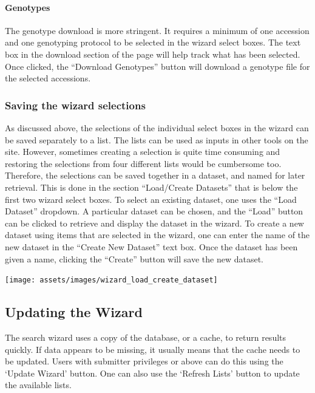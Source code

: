 \documentclass[
  12pt,
]{book}
\begin{document}
\hypertarget{genotypes}{%
\paragraph*{Genotypes}\label{genotypes}}

The genotype download is more stringent. It requires a minimum of one accession and one genotyping protocol to be selected in the wizard select boxes. The text box in the download section of the page will help track what has been selected. Once clicked, the ``Download Genotypes'' button will download a genotype file for the selected accessions.

\hypertarget{saving-the-wizard-selections}{%
\subsubsection*{Saving the wizard selections}\label{saving-the-wizard-selections}}


As discussed above, the selections of the individual select boxes in the wizard can be saved separately to a list. The lists can be used as inputs in other tools on the site. However, sometimes creating a selection is quite time consuming and restoring the selections from four different lists would be cumbersome too. Therefore, the selections can be saved together in a dataset, and named for later retrieval. This is done in the section ``Load/Create Datasets'' that is below the first two wizard select boxes. To select an existing dataset, one uses the ``Load Dataset'' dropdown. A particular dataset can be chosen, and the ``Load'' button can be clicked to retrieve and display the dataset in the wizard. To create a new dataset using items that are selected in the wizard, one can enter the name of the new dataset in the ``Create New Dataset'' text box. Once the dataset has been given a name, clicking the ``Create'' button will save the new dataset.

\begin{center}\texttt{[image: assets/images/wizard\_load\_create\_dataset]} \end{center}

\hypertarget{updating-the-wizard}{%
\subsection{Updating the Wizard}\label{updating-the-wizard}}

The search wizard uses a copy of the database, or a cache, to return results quickly. If data appears to be missing, it usually means that the cache needs to be updated. Users with submitter privileges or above can do this using the `Update Wizard' button. One can also use the `Refresh Lists' button to update the available lists.
\end{document}
